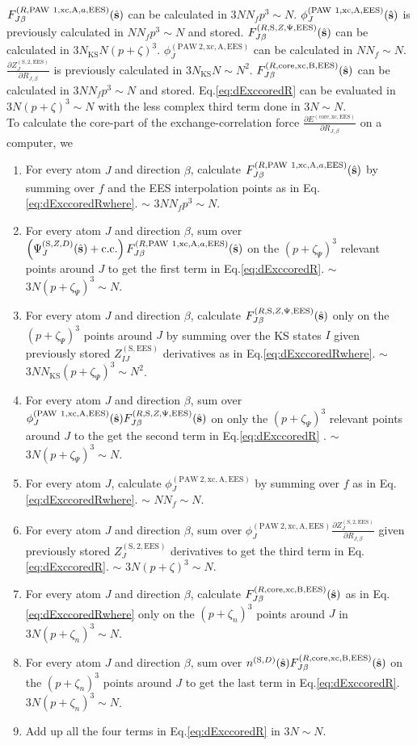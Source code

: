 \documentclass[paper=a4, fontsize=11pt]{article} %
\numberwithin{equation}{section} %
\numberwithin{figure}{section} %
\numberwithin{table}{section} %
\newcommand{\p}{\partial}
\newcommand{\bs}{{\bf{s}}}
\newcommand{\hs}{{\hat{\bf{s}}}}
\newcommand{\rS}{{\mathrm{S}}}
\newcommand{\rEES}{{\mathrm{EES}}}
\newcommand{\rxc}{{\mathrm{xc}}}
\newcommand{\rcore}{{\mathrm{core}}}
\newcommand{\rcc}{{\mathrm{c.c.}}}
\newcommand{\rP}{{\mathrm{PAW}}}
\newcommand{\rA}{{\mathrm{A}}}
\newcommand{\rB}{{\mathrm{B}}}
\newcommand{\RJb}{{R_{J,\beta}}}
\newcommand{\NKS}{{N_{\mathrm{KS}}}}
\newcommand{\pz}{{(p+\zeta)^3}}
\newcommand{\pzp}{{(p+\zeta_{\Psi})^3}}
\newcommand{\pzn}{{(p+\zeta_n)^3}}
\begin{document}
$F_{J\beta}^{(R,\rP\ 1,\rxc,\rA,a,\rEES)}(\hs)$ can be calculated in $3N N_f p^3 \sim N$. $\phi_J^{(\rP\ 1,\rxc,\rA,\rEES)}(\hs)$ is previously calculated in $NN_f p^3 \sim N$ and stored. $F_{J\beta}^{(R,\rS,Z,\Psi,\rEES)}(\hs)$ can be calculated in $3\NKS N \pz$. $\phi_J^{(\rP\ 2,\rxc,\rA,\rEES)}$ can be calculated in $NN_f \sim N$. $\frac{\p Z_{J}^{(\rS,2,\rEES)}}{\p \RJb}$ is previously calculated in $3\NKS N \sim N^2$. $F_{J\beta}^{(R,\rcore,\rxc,\rB,\rEES)}(\hs)$ can be calculated in $3NN_f p^3 \sim N$ and stored. Eq.\eqref{eq:dExccoredR} can be evaluated in $3N \pz \sim N$ with the less complex third term done in $3N \sim N$.\\

To calculate the core-part of the exchange-correlation force $\frac{\p E^{(\rcore,\rxc,\rEES)}}{\p \RJb}$ on a computer, we
\begin{enumerate}
\item For every atom $J$ and direction $\beta$, calculate $F_{J\beta}^{(R,\rP\ 1,\rxc,\rA,a,\rEES)}(\hs)$ by summing over $f$ and the EES interpolation points as in Eq.\eqref{eq:dExccoredRwhere}. $\sim$ $3 N N_f p^3 \sim N$.
\item For every atom $J$ and direction $\beta$, sum over $\left(\Psi_J^{(\rS,Z,D)}(\hs)+ \rcc\right) F_{J\beta}^{(R,\rP\ 1,\rxc,\rA,a,\rEES)}(\hs)$ on the $\pzp$ relevant points around $J$ to get the first term in Eq.\eqref{eq:dExccoredR}. $\sim$ $3N \pzp \sim N$.
\item For every atom $J$ and direction $\beta$, calculate $F_{J\beta}^{(R,\rS,Z,\Psi,\rEES)}(\hs)$ only on the $\pzp$ points around $J$ by summing over the KS states $I$ given previously stored $Z_{IJ}^{(\rS,\rEES)}$ derivatives as in Eq.\eqref{eq:dExccoredRwhere}. $\sim$ $3 N \NKS \pzp \sim N^2$.
\item For every atom $J$ and direction $\beta$, sum over $\phi_J^{(\rP\ 1,\rxc,\rA,\rEES)}(\hs)F_{J\beta}^{(R,\rS,Z,\Psi,\rEES)}(\hs)$ on only the $\pzp$ relevant points around $J$ to the get the second term in Eq.\eqref{eq:dExccoredR} . $\sim$ $3N \pzp \sim N$.
\item For every atom $J$, calculate $\phi_J^{(\rP\ 2,\rxc,\rA,\rEES)}$ by summing over $f$ as in Eq.\eqref{eq:dExccoredRwhere}. $\sim$ $N N_f \sim N$.
\item For every atom $J$ and direction $\beta$, sum over $\phi_J^{(\rP\ 2,\rxc,\rA,\rEES)}\frac{\p Z_{J}^{(\rS,2,\rEES)}}{\p \RJb}$ given previously stored $Z_{J}^{(\rS,2,\rEES)}$ derivatives to get the third term in Eq.\eqref{eq:dExccoredR}. $\sim$ $3N (p+\zeta)^3 \sim N$.
\item For every atom $J$ and direction $\beta$, calculate $F_{J\beta}^{(R,\rcore,\rxc,\rB,\rEES)}(\hs)$ as in Eq.\eqref{eq:dExccoredRwhere} only on the $\pzn$ points around $J$ in $3 N \pzn \sim N$.
\item For every atom $J$ and direction $\beta$, sum over $n^{(\rS,D)}(\hat \bs) F_{J\beta}^{(R,\rcore,\rxc,\rB,\rEES)}(\hs)$ on the $\pzn$ points around $J$ to get the last term in Eq.\eqref{eq:dExccoredR}. $3 N \pzn \sim N$.
\item Add up all the four terms in Eq.\eqref{eq:dExccoredR} in $3N \sim N$.
\end{enumerate}
\end{document}
